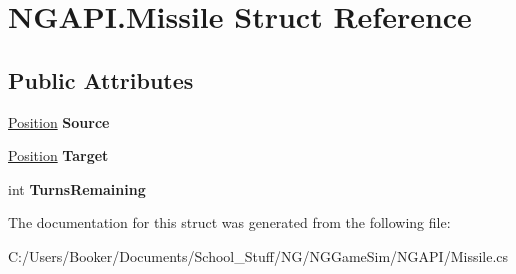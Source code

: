 \hypertarget{struct_n_g_a_p_i_1_1_missile}{}\section{N\+G\+A\+P\+I.\+Missile Struct Reference}
\label{struct_n_g_a_p_i_1_1_missile}
\subsection*{Public Attributes}
\begin{DoxyCompactItemize}
\item 
\mbox{\label{struct_n_g_a_p_i_1_1_missile_a8905f148af360e48c37397b49c47912b}} 
\hyperlink{struct_n_g_a_p_i_1_1_position}{Position} {\bfseries Source}
\item 
\mbox{\label{struct_n_g_a_p_i_1_1_missile_a0d2d8765dae6936e76cff30b2e871522}} 
\hyperlink{struct_n_g_a_p_i_1_1_position}{Position} {\bfseries Target}
\item 
\mbox{\label{struct_n_g_a_p_i_1_1_missile_ab87aa488219c70fd10e55451fece8593}} 
int {\bfseries Turns\+Remaining}
\end{DoxyCompactItemize}


The documentation for this struct was generated from the following file\+:\begin{DoxyCompactItemize}
\item 
C\+:/\+Users/\+Booker/\+Documents/\+School\+\_\+\+Stuff/\+N\+G/\+N\+G\+Game\+Sim/\+N\+G\+A\+P\+I/Missile.\+cs\end{DoxyCompactItemize}

